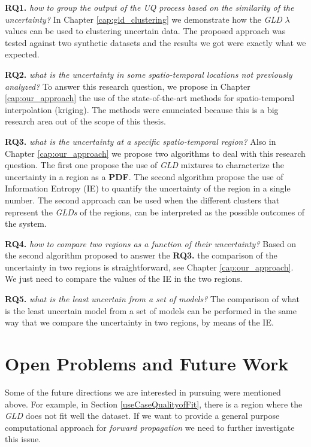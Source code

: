 \textbf{RQ1.} \textit{how to group the output of the UQ process based on the similarity of the uncertainty?}
In Chapter \ref{cap:gld_clustering} we demonstrate how the \textit{GLD} $\lambda$ values can be used to clustering uncertain data. The proposed approach was tested against two synthetic datasets and the results we got were exactly what we expected. 

\textbf{RQ2.} \textit{what is the uncertainty in some spatio-temporal locations not previously analyzed?}
To answer this research question, we propose in Chapter \ref{cap:our_approach} the use of the state-of-the-art methods for spatio-temporal interpolation (kriging). The methods were enunciated because this is a big research area out of the scope of this thesis.

\textbf{RQ3.} \textit{what is the uncertainty at a specific spatio-temporal region?}
Also in Chapter \ref{cap:our_approach} we propose two algorithms to deal with this research question. The first one propose the use of \textit{GLD} mixtures to characterize the uncertainty in a region as a \textbf{PDF}. The second algorithm propose the use of Information Entropy (IE) to quantify the uncertainty of the region in a single number. The second approach can be used when the different clusters that represent the \textit{GLDs} of the regions, can be interpreted as the possible outcomes of the system.

\textbf{RQ4.} \textit{how to compare two regions as a function of their uncertainty?}
Based on the second algorithm proposed to answer the \textbf{RQ3.} the comparison of the uncertainty in two regions is straightforward, see Chapter \ref{cap:our_approach}. We just need to compare the values of the IE in the two regions.

\textbf{RQ5.} \textit{what is the least uncertain from a set of models?}
The comparison of what is the least uncertain model from a set of models can be performed in the same way that we compare the uncertainty in two regions, by means of the IE.

\section{Open Problems and Future Work}
Some of the future directions we are interested in pursuing were mentioned above. For example, in Section \ref{useCaseQualityofFit}, there is a region where the \textit{GLD} does not fit well the dataset. If we want to provide a general purpose computational approach for \textit{forward propagation} we need to further investigate this issue.

